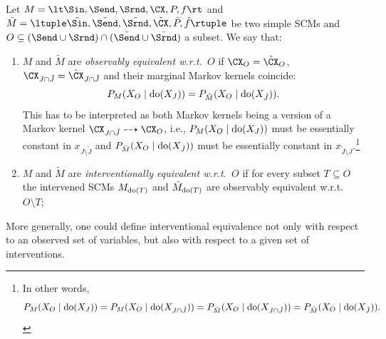 \begin{Def}\label{def:scm_obs_interv_equiv}
  Let $M = \lt \Sin, \Send, \Srnd, \CX, P, f \rt$ and
  $\tilde{M} = \ltuple \tilde{\Sin}, \tilde{\Send}, \tilde{\Srnd}, \tilde{\CX}, \tilde{P}, \tilde{f} \rtuple$ be two simple SCMs
  and $O \subseteq (\Send \cup \Srnd) \cap (\tilde{\Send} \cup \tilde{\Srnd})$ a subset.
  We say that:
  \begin{enumerate}
    \item $M$ and $\tilde{M}$ are \emph{observably equivalent w.r.t.\ $O$} if $\CX_O = \tilde{\CX}_O$, $\CX_{J \cap \tilde{J}} = \tilde{\CX}_{J \cap \tilde{J}}$ and their marginal Markov kernels coincide: 
      $$P_{M}(X_O \mid \operatorname{do}(X_J)) = P_{\tilde{M}}(X_O \mid \operatorname{do}(X_{\tilde J})).$$
    This has to be interpreted as both Markov kernels being a version of a Markov kernel $\CX_{J \cap \tilde{J}} \dshto \CX_O$,
    i.e., $P_{M}(X_O \mid \operatorname{do}(X_J))$ must be essentially constant in $x_{J \setminus \tilde{J}}$ and
    $P_{\tilde{M}}(X_O \mid \operatorname{do}(X_{\tilde{J}}))$ must be essentially constant in $x_{\tilde{J} \setminus J}$.\footnote{In other words,
      $$P_{M}(X_O \mid \operatorname{do}(X_J)) = P_{M}(X_O \mid \operatorname{do}(X_{J \cap \tilde{J}})) =
      P_{\tilde{M}}(X_O \mid \operatorname{do}(X_{J \cap \tilde{J}})) = P_{\tilde{M}}(X_O \mid \operatorname{do}(X_{\tilde{J}})).$$}
    \item $M$ and $\tilde{M}$ are \emph{interventionally equivalent w.r.t.\ $O$} if for every subset $T \subseteq O$ the intervened SCMs $M_{\operatorname{do}(T)}$ and $\tilde{M}_{\operatorname{do}(T)}$ are observably equivalent w.r.t.\ $O \setminus T$;
  \end{enumerate}
\end{Def}
More generally, one could define interventional equivalence not only with respect to an observed set of variables, but also with respect to a given set of interventions.

